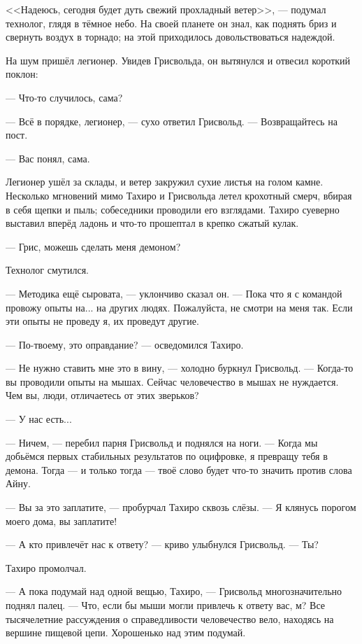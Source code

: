 <<Надеюсь, сегодня будет дуть свежий прохладный ветер>>, --- подумал технолог, глядя в тёмное небо.
На своей планете он знал, как поднять бриз и свернуть воздух в торнадо;
на этой приходилось довольствоваться надеждой.

На шум пришёл легионер.
Увидев Грисвольда, он вытянулся и отвесил короткий поклон:

--- Что-то случилось, сама?

--- Всё в порядке, легионер, --- сухо ответил Грисвольд.
--- Возвращайтесь на пост.

--- Вас понял, сама.

Легионер ушёл за склады, и ветер закружил сухие листья на голом камне.
Несколько мгновений мимо Тахиро и Грисвольда летел крохотный смерч, вбирая в себя щепки и пыль;
собеседники проводили его взглядами.
Тахиро суеверно выставил вперёд ладонь и что-то прошептал в крепко сжатый кулак.

--- Грис, можешь сделать меня демоном?

Технолог смутился.

--- Методика ещё сыровата, --- уклончиво сказал он.
--- Пока что я с командой провожу опыты на... на других людях.
Пожалуйста, не смотри на меня так.
Если эти опыты не проведу я, их проведут другие.

--- По-твоему, это оправдание? --- осведомился Тахиро.

--- Не нужно ставить мне это в вину, --- холодно буркнул Грисвольд.
--- Когда-то вы проводили опыты на мышах.
Сейчас человечество в мышах не нуждается.
Чем вы, люди, отличаетесь от этих зверьков?

--- У нас есть...

--- Ничем, --- перебил парня Грисвольд и поднялся на ноги.
--- Когда мы добьёмся первых стабильных результатов по оцифровке, я превращу тебя в демона.
Тогда --- и только тогда --- твоё слово будет что-то значить против слова Айну.

--- Вы за это заплатите, --- пробурчал Тахиро сквозь слёзы.
--- Я клянусь порогом моего дома, вы заплатите!

--- А кто привлечёт нас к ответу? --- криво улыбнулся Грисвольд.
--- Ты?

Тахиро промолчал.

--- А пока подумай над одной вещью, Тахиро, --- Грисвольд многозначительно поднял палец.
--- Что, если бы мыши могли привлечь к ответу вас, м?
Все тысячелетние рассуждения о справедливости человечество вело, находясь на вершине пищевой цепи.
Хорошенько над этим подумай.

